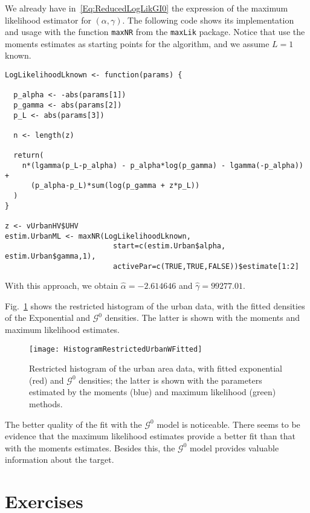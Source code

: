 We already have in~\eqref{Eq:ReducedLogLikGI0} the expression of the maximum likelihood estimator for $(\alpha,\gamma)$.
The following code shows its implementation and usage with the function \verb|maxNR| from the \verb|maxLik| package\cite{maxLik}.
Notice that use the moments estimates as starting points for the algorithm, and we assume $L=1$ known.

\begin{lstlisting}[frame=lines]
LogLikelihoodLknown <- function(params) {
  
  p_alpha <- -abs(params[1])
  p_gamma <- abs(params[2])
  p_L <- abs(params[3])
  
  n <- length(z)
  
  return(
    n*(lgamma(p_L-p_alpha) - p_alpha*log(p_gamma) - lgamma(-p_alpha)) + 
      (p_alpha-p_L)*sum(log(p_gamma + z*p_L)) 
  )
}

z <- vUrbanHV$UHV
estim.UrbanML <- maxNR(LogLikelihoodLknown, 
                         start=c(estim.Urban$alpha, estim.Urban$gamma,1), 
                         activePar=c(TRUE,TRUE,FALSE))$estimate[1:2]
\end{lstlisting}

With this approach, we obtain $\widehat{\alpha}=-2.614646$ and $\widehat\gamma=99277.01$.

Fig.~\ref{Fig:UrbanFitted} shows the restricted histogram of the urban data, with the fitted densities of the Exponential and $\mathcal G^0$ densities.
The latter is shown with the moments and maximum likelihood estimates.

\begin{figure}[hbt]
\centering
\texttt{[image: HistogramRestrictedUrbanWFitted]}
\caption{Restricted histogram of the urban area data, with fitted exponential (red) and $\mathcal G^0$ densities; the latter is shown with the parameters estimated by the moments (blue) and maximum likelihood (green) methods.}\label{Fig:UrbanFitted}
\end{figure}

The better quality of the fit with the $\mathcal G^0$ model is noticeable.
There seems to be evidence that the maximum likelihood estimates provide a better fit than that with the moments estimates.
Besides this, the $\mathcal G^0$ model provides valuable information about the target.

\section*{Exercises}

